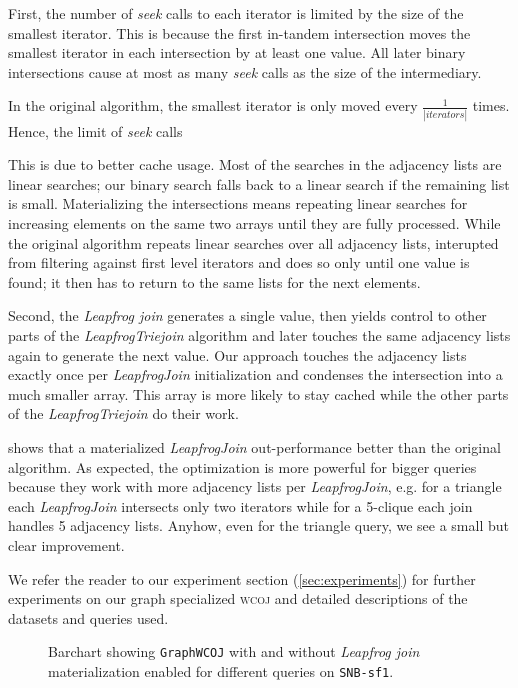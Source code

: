 First, the number of \textit{seek} calls to each iterator is limited by the size of the smallest iterator.
This is because the first in-tandem intersection moves the smallest iterator in each intersection
by at least one value.
All later binary intersections cause at most as many \textit{seek} calls as the size of the intermediary.

In the original algorithm, the smallest iterator is only moved every $\frac{1}{|iterators|}$ times.
Hence, the limit of \textit{seek} calls

This is due to better cache usage.
Most of the searches in the adjacency lists are linear searches;
our binary search falls back to a linear search if the remaining list is small.
Materializing the intersections means repeating linear searches for increasing elements on the same
two arrays until they are fully processed.
While the original algorithm repeats linear searches over all adjacency lists, interupted from filtering
against first level iterators and does so only until one value is found;
it then has to return to the same lists for the next elements.

Second, the \textit{Leapfrog join} generates a single value, then yields control to other parts
of the \textit{LeapfrogTriejoin} algorithm and later touches the same adjacency lists again to generate the next value.
Our approach touches the adjacency lists exactly once per \textit{LeapfrogJoin} initialization and
condenses the intersection into a much smaller array.
This array is more likely to stay cached while the other parts of the \textit{LeapfrogTriejoin} do their work.

 shows that a materialized \textit{LeapfrogJoin} out-performance better than
the original algorithm.
As expected, the optimization is more powerful for bigger queries because they work with more
adjacency lists per \textit{LeapfrogJoin}, e.g. for a triangle each \textit{LeapfrogJoin} intersects
only two iterators while for a 5-clique each join handles 5 adjacency lists.
Anyhow, even for the triangle query, we see a small but clear improvement.

We refer the reader to our experiment section (\ref{sec:experiments}) for further experiments on
our graph specialized \textsc{wcoj} and detailed descriptions of the datasets and queries used.

\begin{figure}[H]
\centering

\caption{Barchart showing \texttt{GraphWCOJ} with and without \textit{Leapfrog join} materialization
enabled for different queries on \texttt{SNB-sf1}.}
\label{fig:mat-vs-nomat}
\end{figure}